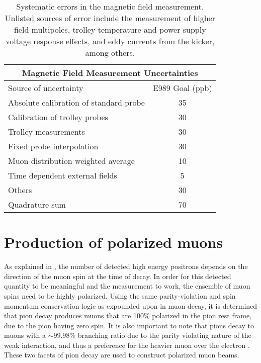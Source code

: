 \begin{table}[]
\centering
\setlength\tabcolsep{10pt}
\renewcommand{\arraystretch}{1.2}
\begin{tabular*}{.8\linewidth}{@{\extracolsep{\fill}}lc}
  \hline
    \multicolumn{2}{c}{\textbf{Magnetic Field Measurement Uncertainties}} \\
  \hline\hline
    Source of uncertainty & E989 Goal (ppb) \\
  \hline
    Absolute calibration of standard probe & 35 \\
    Calibration of trolley probes & 30 \\
    Trolley measurements & 30 \\
    Fixed probe interpolation & 30 \\
    Muon distribution weighted average & 10 \\
    Time dependent external fields & 5 \\
    Others & 30 \\
  \hline
    Quadrature sum & 70 \\
  \hline 
\end{tabular*}
\caption[Uncertainties in the magnetic field measurement]{Systematic errors in the magnetic field measurement. Unlisted sources of error include the measurement of higher field multipoles, trolley temperature and power supply voltage response effects, and eddy currents from the kicker, among others.}
\label{tab:magneticfielduncertainties}
\end{table}



\section{Production of polarized muons}
\label{sec:Accelerator}

As explained in , the number of detected high energy positrons depends on the direction of the muon spin at the time of decay. In order for this detected quantity to be meaningful and the measurement to work, the ensemble of muon spins need to be highly polarized. Using the same parity-violation and spin momentum conservation logic as expounded upon in muon decay, it is determined that pion decay produces muons that are 100\% polarized in the pion rest frame, due to the pion having zero spin. It is also important to note that pions decay to muons with a $\sim 99.98\%$ branching ratio due to the parity violating nature of the weak interaction, and thus a preference for the heavier muon over the electron \cite{PDG}. These two facets of pion decay are used to construct polarized muon beams.

